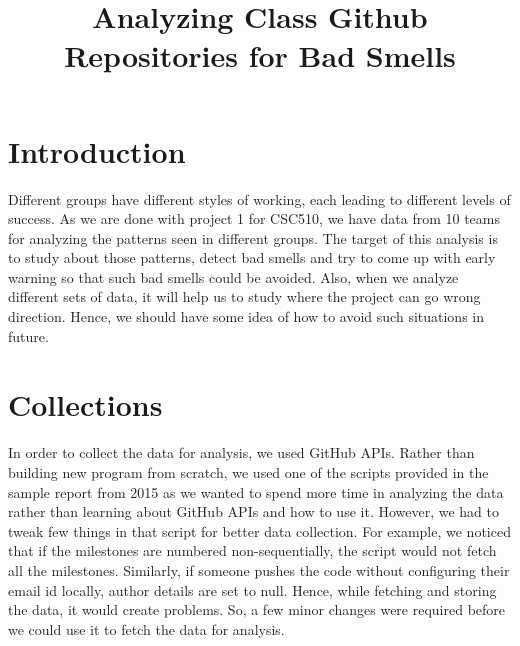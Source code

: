 \documentclass[conference]{IEEEtran}
\begin{document}
\title{Analyzing Class Github Repositories for Bad Smells}


\author{
}


\maketitle

\section{Introduction}
Different groups have different styles of working, each leading to different levels of success. As we are done with project 1 for CSC510, we have data from 10 teams for analyzing the patterns seen in different groups. The target of this analysis is to study about those patterns, detect bad smells and try to come up with early warning so that such bad smells could be avoided. Also, when we analyze different sets of data, it will help us to study where the project can go wrong direction. Hence, we should have some idea of how to avoid such situations in future.    

\section{Collections}
In order to collect the data for analysis, we used GitHub APIs. Rather than building new program from scratch, we used one of the scripts provided in the sample report from 2015 as we wanted to spend more time in analyzing the data rather than learning about GitHub APIs and how to use it. However, we had to tweak few things in that script for better data collection. For example, we noticed that if the milestones are numbered non-sequentially, the script would not fetch all the milestones. Similarly, if someone pushes the code without configuring their email id locally, author details are set to null. Hence, while fetching and storing the data, it would create problems. So, a few minor changes were required before we could use it to fetch the data for analysis.
\end{document}
